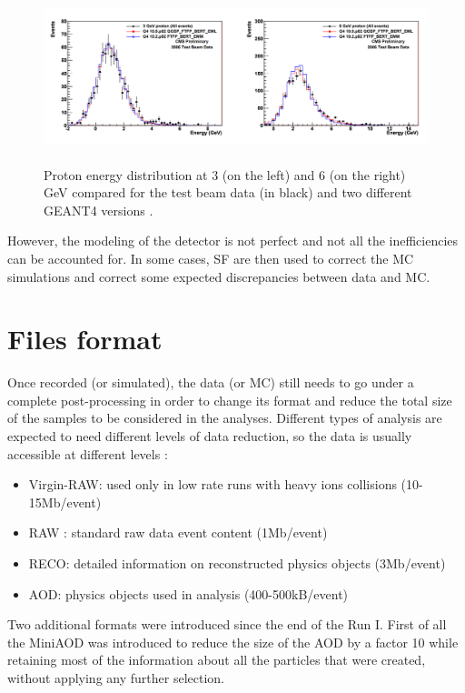 \documentclass[a4paper, 10pt, openright]{report}
\begin{document}
\begin{figure}[htbp]
\begin{center}
\includegraphics[width=14cm, height=5cm]{figs/CMSGEANT.png}
\caption{Proton energy distribution at 3 (on the left) and 6 (on the right) GeV compared for the test beam data (in black) and two different GEANT4 versions \cite{GEANTComp}.}
\label{fig:CMSGEANT}
\end{center}
\end{figure}

However, the modeling of the detector is not perfect and not all the inefficiencies can be accounted for. In some cases, \ac{SF} are then used to correct the \ac{MC} simulations and correct some expected discrepancies between data and \ac{MC}.

\section{Files format} \label{section:Files}

Once recorded (or simulated), the data (or \ac{MC}) still needs to go under a complete post-processing in order to change its format and reduce the total size of the samples to be considered in the analyses. Different types of analysis are expected to need different levels of data reduction, so the data is usually accessible at different levels \cite{nanoAOD}:

\begin{itemize}
\item Virgin-RAW: used only in low rate runs with heavy ions collisions (10-15Mb/event)
\item RAW : standard raw data event content (1Mb/event)
\item RECO: detailed information on reconstructed physics objects (3Mb/event)
\item \ac{AOD}: physics objects used in analysis (400-500kB/event)
\end{itemize}

Two additional formats were introduced since the end of the Run I. First of all the MiniAOD was introduced to reduce the size of the \ac{AOD} by a factor 10 while retaining most of the information about all the particles that were created, without applying any further selection.
\end{document}
